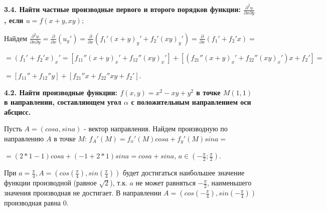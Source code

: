 \documentclass{article}
\begin{document}
\noindent \textbf{3.4. Найти частные производные первого и второго порядков функции: $\frac{\partial^2  u}{\partial x \partial y}$, если $u = f(x+y,xy);$}
\vspace{1mm}

Найдем $\frac{\partial^2  u}{\partial x \partial y} = \frac{\partial }{\partial x}(u_y') = \frac{\partial }{\partial x}(f_1'(x+y)_y'+f_2'(xy)_y') = \frac{\partial }{\partial x}(f_1' + f_2'x) =$
\vspace{1mm}

$= (f_1' + f_2'x)_x' =[f_{11}''(x+y)_x' + f_{12}''(xy)_x'] + [(f_{21}''(x+y)_x'+f_{22}''(xy)_x')x+f_2']=$\vspace{1mm}

$= [f_{11}''+f_{12}''y]+[f_{21}''x + f_{22}''xy + f_2']$.
\vspace{3mm}

\noindent \textbf{4.2. Найти производные функции: $f(x,y)=x^2-xy+y^2$ в точке $M(1,1)$ в направлении, составляющем угол $\alpha$ с положительным направлением оси абсцисс.}
\vspace{1mm}

Пусть $A = (cosa, sina)$ - вектор направления. Найдем производную по направлению $A$ в точке $M$: $f_A'(M) = f_x'(M)cosa + f_y'(M)sina =$ \vspace{1mm}

\noindent$=(2*1-1)cosa+(-1+2*1)sina=cosa+sina$, $a \in (-\frac{\pi}{2};\frac{\pi}{2})$.

При $a = \frac{\pi}{4}, A = (cos(\frac{\pi}{4}), sin(\frac{\pi}{4}))$ будет достигаться наибольшее значение функции производной (равное $\sqrt{2}$), т.к. $a$ не может равняться $-\frac{\pi}{2}$, наименьшего значения производная не достигает. В направлении $A = (cos(-\frac{\pi}{4}),sin(-\frac{\pi}{4}))$ производная равна 0.
\vspace{3mm}
\end{document}
